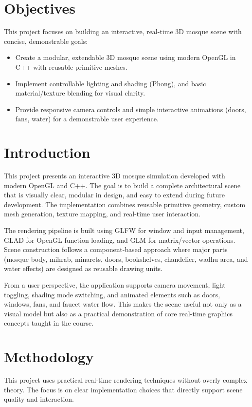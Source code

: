 \documentclass[a4paper,12pt]{extarticle}
\begin{document}
\clearpage
{}

\section{Objectives}
This project focuses on building an interactive, real-time 3D mosque scene with concise, demonstrable goals:
\begin{itemize}
    \item Create a modular, extendable 3D mosque scene using modern OpenGL in C++ with reusable primitive meshes.
    \item Implement controllable lighting and shading (Phong), and basic material/texture blending for visual clarity.
    \item Provide responsive camera controls and simple interactive animations (doors, fans, water) for a demonstrable user experience.
\end{itemize}

\section{Introduction}
This project presents an interactive 3D mosque simulation developed with modern OpenGL and C++. The goal is to build a complete architectural scene that is visually clear, modular in design, and easy to extend during future development. The implementation combines reusable primitive geometry, custom mesh generation, texture mapping, and real-time user interaction.

The rendering pipeline is built using GLFW for window and input management, GLAD for OpenGL function loading, and GLM for matrix/vector operations. Scene construction follows a component-based approach where major parts (mosque body, mihrab, minarets, doors, bookshelves, chandelier, wadhu area, and water effects) are designed as reusable drawing units.

From a user perspective, the application supports camera movement, light toggling, shading mode switching, and animated elements such as doors, windows, fans, and faucet water flow. This makes the scene useful not only as a visual model but also as a practical demonstration of core real-time graphics concepts taught in the course.

\section{Methodology}
This project uses practical real-time rendering techniques without overly complex theory. The focus is on clear implementation choices that directly support scene quality and interaction.
\end{document}

